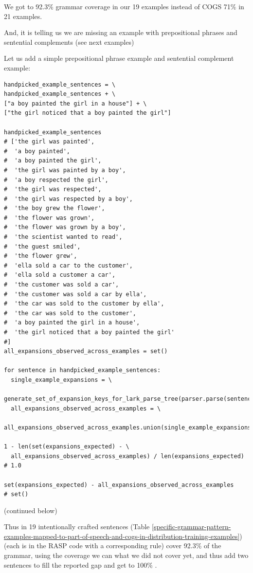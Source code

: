 \documentclass[11pt]{article}
\begin{document}
\clearpage
We got to 92.3\% grammar coverage in our 19 examples instead of COGS 71\% in 21 examples.

And, it is telling us we are missing an example with prepositional phrases and sentential complements (see next examples)

Let us add a simple prepositional phrase example and sentential complement example:
\begin{tiny}
\begin{verbatim}
handpicked_example_sentences = \
handpicked_example_sentences + \
["a boy painted the girl in a house"] + \
["the girl noticed that a boy painted the girl"]

handpicked_example_sentences
# ['the girl was painted',
#  'a boy painted',
#  'a boy painted the girl',
#  'the girl was painted by a boy',
#  'a boy respected the girl',
#  'the girl was respected',
#  'the girl was respected by a boy',
#  'the boy grew the flower',
#  'the flower was grown',
#  'the flower was grown by a boy',
#  'the scientist wanted to read',
#  'the guest smiled',
#  'the flower grew',
#  'ella sold a car to the customer',
#  'ella sold a customer a car',
#  'the customer was sold a car',
#  'the customer was sold a car by ella',
#  'the car was sold to the customer by ella',
#  'the car was sold to the customer',
#  'a boy painted the girl in a house',
#  'the girl noticed that a boy painted the girl'
#]
all_expansions_observed_across_examples = set()

for sentence in handpicked_example_sentences:
  single_example_expansions = \
    generate_set_of_expansion_keys_for_lark_parse_tree(parser.parse(sentence.lower()))
  all_expansions_observed_across_examples = \
    all_expansions_observed_across_examples.union(single_example_expansions)

1 - len(set(expansions_expected) - \
  all_expansions_observed_across_examples) / len(expansions_expected)
# 1.0

set(expansions_expected) - all_expansions_observed_across_examples
# set()
\end{verbatim}
\end{tiny}
(continued below)
\clearpage

Thus in 19 intentionally crafted sentences (Table \ref{specific-grammar-pattern-examples-mapped-to-part-of-speech-and-cogs-in-distribution-training-examples}) (each is in the RASP code with a corresponding rule) cover 92.3\% of the grammar, 
using the coverage we can what we did not cover yet, and thus add two sentences to fill the reported gap and get to 100\% .
\end{document}
